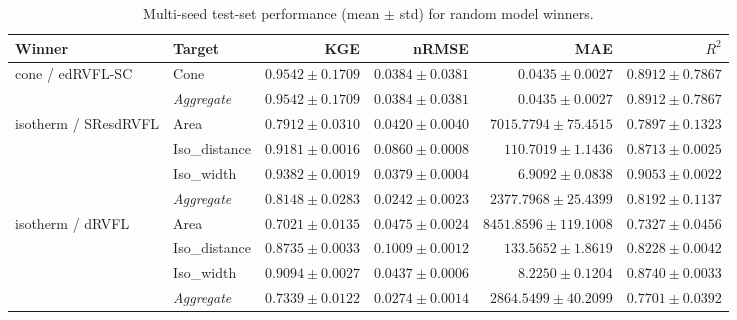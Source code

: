 \begin{table}[htbp]
  \centering
  \caption{Multi-seed test-set performance (mean $\pm$ std) for random model winners.}
  \label{tab:seed-sweep}
  \begin{tabular}{llrrrr}
    \toprule
    Winner & Target & KGE & nRMSE & MAE & $R^2$ \\
    \midrule
    cone / edRVFL-SC & Cone & $0.9542 \pm 0.1709$ & $0.0384 \pm 0.0381$ & $0.0435 \pm 0.0027$ & $0.8912 \pm 0.7867$ \\
     & \textit{Aggregate} & $0.9542 \pm 0.1709$ & $0.0384 \pm 0.0381$ & $0.0435 \pm 0.0027$ & $0.8912 \pm 0.7867$ \\
    \midrule
    isotherm / SResdRVFL & Area & $0.7912 \pm 0.0310$ & $0.0420 \pm 0.0040$ & $7015.7794 \pm 75.4515$ & $0.7897 \pm 0.1323$ \\
     & Iso_distance & $0.9181 \pm 0.0016$ & $0.0860 \pm 0.0008$ & $110.7019 \pm 1.1436$ & $0.8713 \pm 0.0025$ \\
     & Iso_width & $0.9382 \pm 0.0019$ & $0.0379 \pm 0.0004$ & $6.9092 \pm 0.0838$ & $0.9053 \pm 0.0022$ \\
     & \textit{Aggregate} & $0.8148 \pm 0.0283$ & $0.0242 \pm 0.0023$ & $2377.7968 \pm 25.4399$ & $0.8192 \pm 0.1137$ \\
    \midrule
    isotherm / dRVFL & Area & $0.7021 \pm 0.0135$ & $0.0475 \pm 0.0024$ & $8451.8596 \pm 119.1008$ & $0.7327 \pm 0.0456$ \\
     & Iso_distance & $0.8735 \pm 0.0033$ & $0.1009 \pm 0.0012$ & $133.5652 \pm 1.8619$ & $0.8228 \pm 0.0042$ \\
     & Iso_width & $0.9094 \pm 0.0027$ & $0.0437 \pm 0.0006$ & $8.2250 \pm 0.1204$ & $0.8740 \pm 0.0033$ \\
     & \textit{Aggregate} & $0.7339 \pm 0.0122$ & $0.0274 \pm 0.0014$ & $2864.5499 \pm 40.2099$ & $0.7701 \pm 0.0392$ \\
    \bottomrule
  \end{tabular}
\end{table}
